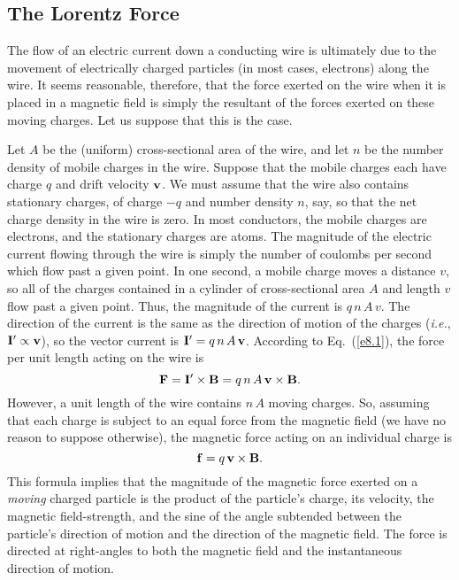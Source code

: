 \subsection{The Lorentz Force}\label{s8.4}
The flow of an electric current down
a conducting  wire is ultimately due to  the movement of
electrically charged particles
(in most cases, electrons) along the wire.
 It seems reasonable, therefore, that
the force exerted on the wire when it is placed in a magnetic field is simply
the resultant of the  forces exerted on these moving charges. Let us
suppose that this is the case. 

Let $A$ be the 
(uniform) cross-sectional area of the wire, and let $n$ be the number density
of mobile charges in the wire. Suppose that the
mobile charges each have charge $q$ and drift velocity ${\bf v}$.
 We must assume that
the wire also contains stationary charges, of charge $-q$ and number density
$n$, say, so that the net charge density in the wire is zero. In most conductors, the
mobile charges are electrons, and the stationary charges are atoms.
The magnitude of the electric current flowing through the wire is simply the
number of coulombs per second which flow past a given point. In one second,
a mobile charge moves a distance $v$, so all of the charges contained in a
cylinder of cross-sectional area $A$ and length $v$ flow past a given point.
Thus, the magnitude of the current is $q\,n\, A\,v$. The direction of the 
current is the same as the direction of motion of the charges ({\em i.e.},
${\bf I}'\propto {\bf v}$), so the
vector current is ${\bf I}' = q\,n\,A\,{\bf v}$.
According to Eq.~(\ref{e8.1}), the force per unit length acting on the wire is
\begin{equation}
{\bf F} = {\bf I}'\times {\bf B} = q\,n \,A \,{\bf v}\times{\bf B}.
\end{equation}
However, a unit length of the wire contains $n\,A$ moving charges. So, assuming
that each charge is subject to an equal force from the magnetic field (we have
no reason to suppose otherwise), the magnetic
force acting on an individual charge is
\begin{equation}\label{e8.7}
{\bf f} = q\,{\bf v} \times{\bf B}.
\end{equation}
This formula implies  that the magnitude of the magnetic force exerted on a {\em moving}
charged particle is the product of the particle's charge, its
 velocity, the
magnetic field-strength, and the sine of the angle subtended between the
particle's direction of motion and the direction of the magnetic field. 
The force is directed at right-angles to both the magnetic field and the
instantaneous direction of motion.

